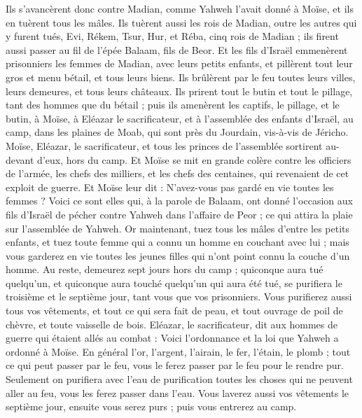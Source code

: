 \begin{multicols}{2}
Ils s'avancèrent donc contre Madian, comme Yahweh l'avait donné à Moïse, et ils en tuèrent tous les mâles.
Ils tuèrent aussi les rois de Madian, outre les autres qui y furent tués, Evi, Rékem, Tsur, Hur, et Réba, cinq rois de Madian ; ils firent aussi passer au fil de l'épée Balaam, fils de Beor.
Et les fils d'Israël emmenèrent prisonniers les femmes de Madian, avec leurs petits enfants, et pillèrent tout leur gros et menu bétail, et tous leurs biens.
Ils brûlèrent par le feu toutes leurs villes, leurs demeures, et tous leurs châteaux.
Ils prirent tout le butin et tout le pillage, tant des hommes que du bétail ;
puis ils amenèrent les captifs, le pillage, et le butin, à Moïse, à Eléazar le sacrificateur, et à l'assemblée des enfants d'Israël, au camp, dans les plaines de Moab, qui sont près du Jourdain, vis-à-vis de Jéricho.
Moïse, Eléazar, le sacrificateur, et tous les princes de l'assemblée sortirent au-devant d'eux, hors du camp.
Et Moïse se mit en grande colère contre les officiers de l'armée, les chefs des milliers, et les chefs des centaines, qui revenaient de cet exploit de guerre.
Et Moïse leur dit : N'avez-vous pas gardé en vie toutes les femmes ?
Voici ce sont elles qui, à la parole de Balaam, ont donné l'occasion aux fils d’Israël de pécher contre Yahweh dans l'affaire de Peor ; ce qui attira la plaie sur l'assemblée de Yahweh.
Or maintenant, tuez tous les mâles d'entre les petits enfants, et tuez toute femme qui a connu un homme en couchant avec lui ;
mais vous garderez en vie toutes les jeunes filles qui n'ont point connu la couche d'un homme.
Au reste, demeurez sept jours hors du camp ; quiconque aura tué quelqu'un, et quiconque aura touché quelqu'un qui aura été tué, se purifiera le troisième et le septième jour, tant vous que vos prisonniers.
Vous purifierez aussi tous vos vêtements, et tout ce qui sera fait de peau, et tout ouvrage de poil de chèvre, et toute vaisselle de bois.
Eléazar, le sacrificateur, dit aux hommes de guerre qui étaient allés au combat : Voici l'ordonnance et la loi que Yahweh a ordonné à Moïse.
En général l'or, l'argent, l'airain, le fer, l'étain, le plomb ;
tout ce qui peut passer par le feu, vous le ferez passer par le feu pour le rendre pur. Seulement on purifiera avec l'eau de purification toutes les choses qui ne peuvent aller au feu, vous les ferez passer dans l'eau.
Vous laverez aussi vos vêtements le septième jour, ensuite vous serez purs ; puis vous entrerez au camp.

\end{multicols}
